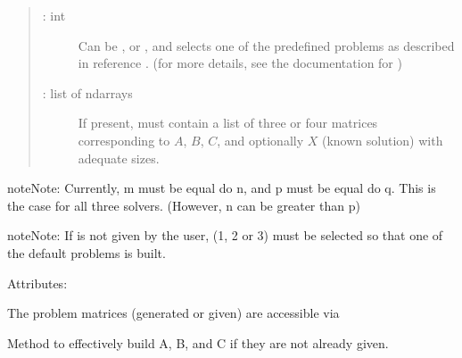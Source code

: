 \documentclass[a4paper,10pt,english]{sphinxmanual}
\begin{document}
\begin{fulllineitems}
\begin{quote}
\begin{description}
\item[{ : int}] \leavevmode
Can be ,  or , and selects one of the predefined
problems as described in reference \label{\detokenize{skprocrustes:id1}}{\hyperref[\detokenize{skprocrustes:zhandu06}]{\sphinxcrossref{{[}ZD06{]}}}}.
(for more details, see the documentation for )

\item[{ : list of ndarrays}] \leavevmode
If present, must contain a list of three or four matrices 
corresponding to \(A\), \(B\), \(C\), and optionally
\(X\) (known solution) with adequate sizes.

\end{description}
\end{quote}

\begin{sphinxadmonition}{note}{Note:}
Currently, m must be equal do n, and p must be equal do q. This 
is the case for all three solvers. (However, n can be greater than
p)
\end{sphinxadmonition}

\begin{sphinxadmonition}{note}{Note:}
If  is not given by the user, 
(1, 2 or 3) must be selected so that one of the default problems 
is built.
\end{sphinxadmonition}

Attributes:

The problem matrices (generated or given) are accessible via

\begin{sphinxVerbatim}[commandchars=\\\{\}]
\end{sphinxVerbatim}

\begin{fulllineitems}
\label{\detokenize{skprocrustes:skprocrustes.ProcrustesProblem._setproblem}}
Method to effectively build A, B, and C if they are not already given.


\end{fulllineitems}
\end{fulllineitems}
\end{document}
